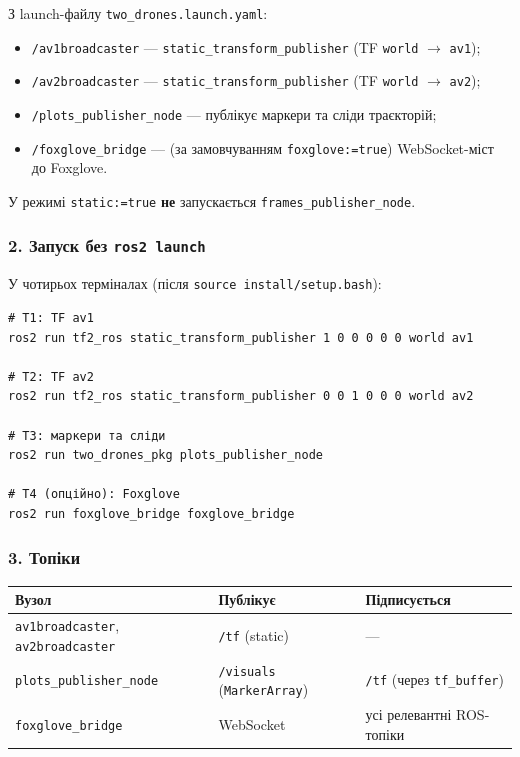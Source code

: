 \documentclass[11pt,a4paper]{article}
\begin{document}
З launch-файлу \texttt{two\_drones.launch.yaml}:
\begin{itemize}
  \item \texttt{/av1broadcaster} --- \texttt{static\_transform\_publisher} (TF \texttt{world} $\rightarrow$ \texttt{av1});
  \item \texttt{/av2broadcaster} --- \texttt{static\_transform\_publisher} (TF \texttt{world} $\rightarrow$ \texttt{av2});
  \item \texttt{/plots\_publisher\_node} --- публікує маркери та сліди траєкторій;
  \item \texttt{/foxglove\_bridge} --- (за замовчуванням \texttt{foxglove:=true}) WebSocket-міст до Foxglove.
\end{itemize}
У режимі \texttt{static:=true} \textbf{не} запускається \texttt{frames\_publisher\_node}.

\subsubsection*{2. Запуск без \texttt{ros2 launch}}

У чотирьох терміналах (після \texttt{source install/setup.bash}):
\begin{verbatim}
# T1: TF av1
ros2 run tf2_ros static_transform_publisher 1 0 0 0 0 0 world av1

# T2: TF av2
ros2 run tf2_ros static_transform_publisher 0 0 1 0 0 0 world av2

# T3: маркери та сліди
ros2 run two_drones_pkg plots_publisher_node

# T4 (опційно): Foxglove
ros2 run foxglove_bridge foxglove_bridge
\end{verbatim}

\subsubsection*{3. Топіки}

\begin{center}
\begin{tabular}{|l|l|l|}
\hline
\textbf{Вузол} & \textbf{Публікує} & \textbf{Підписується} \\
\hline
\texttt{av1broadcaster}, \texttt{av2broadcaster} & \texttt{/tf} (static) & --- \\
\texttt{plots\_publisher\_node} & \texttt{/visuals} (\texttt{MarkerArray}) & \texttt{/tf} (через \texttt{tf\_buffer}) \\
\texttt{foxglove\_bridge} & WebSocket & усі релевантні ROS-топіки \\
\hline
\end{tabular}
\end{center}
\end{document}
